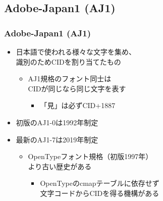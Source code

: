 \subsection{Adobe-Japan1 (AJ1)}
\begin{frame}\frametitle{Adobe-Japan1 (AJ1)}
  \begin{itemize}
  \item 日本語で使われる様々な文字を集め、 \\
    識別のためCIDを割り当てたもの
    \begin{itemize}
    \item AJ1規格のフォント同士は \\
      CIDが同じなら同じ文字を表す
      \begin{itemize}
      \item 「見」は必ずCID+1887
      \end{itemize}
    \end{itemize}
  \item 初版のAJ1-0は1992年制定
  \item 最新のAJ1-7は2019年制定
    \begin{itemize}
    \item OpenTypeフォント規格（初版1997年） \\ より古い歴史がある
      \begin{itemize}
      \item OpenTypeのcmapテーブルに依存せず \\
        文字コードからCIDを得る機構がある
      \end{itemize}
    \end{itemize}
  \end{itemize}
\end{frame}

